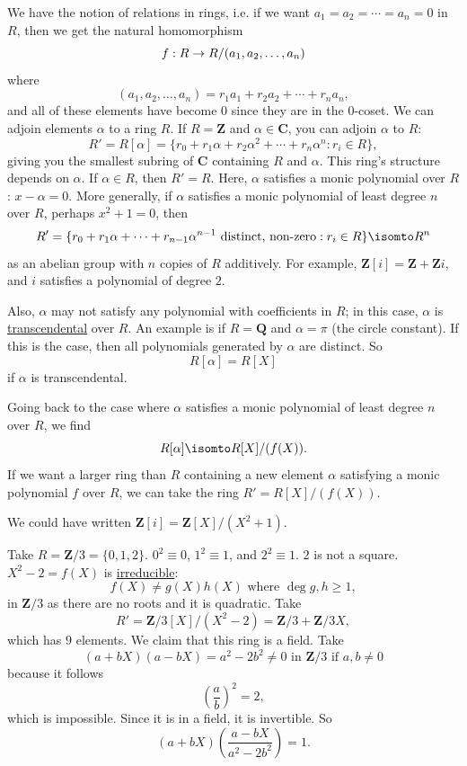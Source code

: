 \documentclass[11pt, oneside]{amsart}
\numberwithin{equation}{section}
\numberwithin{theorem}{section}
\theoremstyle{definition}
\let\bar\relax
\def\Z{\mathbf{Z}}
\def\Q{\mathbf{Q}}
\def\C{\mathbf{C}}
\begin{document}
{We have the notion of relations in rings, i.e. if we want $a_1=a_2=\cdots=a_n=0$ in $R$, then we get the natural homomorphism
$$
f: R \to\bar R/(a_1,a_2,\hdots,a_n)
$$
where
$$
(a_1,a_2,\hdots,a_n) = r_1a_1 + r_2a_2 +\cdots+r_na_n,
$$
and all of these elements have become $0$ since they are in the $0$-coset. We can adjoin elements $\alpha$ to a ring $R$. If $R=\Z$ and $\alpha\in \C$, you can adjoin $\alpha$ to $R$:
$$
R' = R[\alpha] = \{ r_0 + r_1\alpha  + r_2\alpha^2 + \cdots + r_n\alpha^n : r_i\in R \},
$$
giving you the smallest subring of $\C$ containing $R$ and $\alpha$. This ring's structure depends on $\alpha$. If $\alpha\in R$, then $R' = R$. Here, $\alpha $ satisfies a monic polynomial over $R$: $x-\alpha = 0$. More generally, if $\alpha$ satisfies a monic polynomial of least degree $n$ over $R$, perhaps $x^2 + 1 = 0$, then 
$$
R' = \{ r_0+r_1\alpha + \cdots + r_{n-1}\alpha^{n-1} \textrm{ distinct, non-zero}: r_i \in R \} \isomto R^n
$$ 
as an abelian group with $n$ copies of $R$ additively. For example, $\Z[i] =\Z+\Z i$, and $i$ satisfies a polynomial of degree $2$. 

Also, $\alpha$ may not satisfy any polynomial with coefficients in $R$; in this case, $\alpha$ is \underline{transcendental} over $R$. An example is if $R=\Q$ and $\alpha = \pi$ (the circle constant). If this is the case, then all polynomials generated by $\alpha$ are distinct. So
$$
R[\alpha] = R[X]
$$
if $\alpha$ is transcendental. 

Going back to the case where $\alpha$ satisfies a monic polynomial of least degree $n$ over $R$, we find
$$
R[\alpha] \isomto R[X] / (f(X)).
$$
If we want a larger ring than $R$ containing a new element $\alpha$ satisfying a monic polynomial $f$ over $R$, we can take the ring $R' = R[X] / (f(X))$.

We could have written $\Z[i] = \Z[X] / (X^2 + 1)$.

Take $R=\Z/3 = \{0,1,2\}$. $0^2 \equiv 0$, $1^2 \equiv 1$, and $2^2 \equiv 1$. $2$ is not a square. $X^2 - 2 =f(X)$ is \underline{irreducible}:
$$
f(X) \neq g(X)h(X)\textrm{ where }\deg g, h\geqslant 1,
$$
in $\Z/3$ as there are no roots and it is quadratic. Take 
$$
R' = \Z/3[X] / (X^2-2) = \Z/3+\Z/3X,
$$ 
which has $9$ elements. We claim that this ring is a field. Take
$$
(a+bX)(a-bX) = a^2 - 2b^2 \neq 0 \textrm{ in } \Z/3 \textrm{ if } a,b\neq0
$$
because it follows 
$$
\left(\frac{a}{b}\right)^2 = 2,
$$
which is impossible. Since it is in a field, it is invertible. So 
$$
(a+bX)\left( \frac{a-bX}{a^2 - 2b^2} \right) = 1.
$$

}
\end{document}
